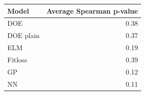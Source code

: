\begin{tabular}{lr}
\toprule
Model & Average Spearman p-value \\
\midrule
DOE & 0.38 \\
DOE plain & 0.37 \\
ELM & 0.19 \\
Fitloss & 0.39 \\
GP & 0.12 \\
NN & 0.11 \\
\bottomrule
\end{tabular}
